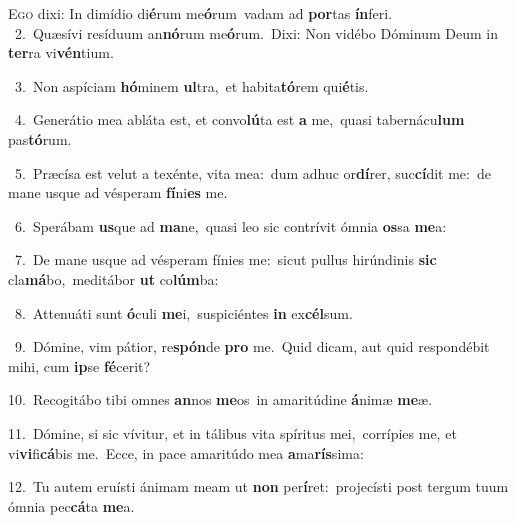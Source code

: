 \lettrine{\initial\textcolor{\initialcolor}{E}}{go} dixi: In dimídio di\-\textbf{é}\-rum me\-\textbf{ó}\-rum~\star vadam ad \textbf{por}\-tas \textbf{ín}\-feri.\\
{\numbfont\textcolor{\numbcolor}{~2.}}~Quæsívi resíduum an\-\textbf{nó}\-rum me\-\textbf{ó}\-rum.~\star Dixi: Non vidébo Dóminum Deum in \textbf{ter}\-ra vi\-\textbf{vén}\-tium.\par
{\numbfont\textcolor{\numbcolor}{~3.}}~Non aspíciam \textbf{hó}\-minem \textbf{ul}\-tra,~\star et habita\-\textbf{tó}\-rem qui\-\textbf{é}\-tis.\par
{\numbfont\textcolor{\numbcolor}{~4.}}~Generátio mea abláta est, et convo\-\textbf{lú}\-ta est \textbf{a} me,~\star quasi tabernácu\textbf{lum} pas\-\textbf{tó}\-rum.\par
{\numbfont\textcolor{\numbcolor}{~5.}}~Præcísa est velut a texénte, vita mea:~\dagger dum adhuc or\-\textbf{dí}\-rer, suc\-\textbf{cí}\-dit me:~\star de mane usque ad vésperam \textbf{fí}\-ni\textbf{es} me.\par
{\numbfont\textcolor{\numbcolor}{~6.}}~Sperábam \textbf{us}\-que ad \textbf{ma}\-ne,~\star quasi leo sic contrívit ómnia \textbf{os}\-sa \textbf{me}\-a:\par
{\numbfont\textcolor{\numbcolor}{~7.}}~De mane usque ad vésperam fínies me:~\dagger sicut pullus hirúndinis \textbf{sic} cla\-\textbf{má}\-bo,~\star meditábor \textbf{ut} co\-\textbf{lúm}\-ba:\par
{\numbfont\textcolor{\numbcolor}{~8.}}~Attenuáti sunt \textbf{ó}\-culi \textbf{me}\-i,~\star suspiciéntes \textbf{in} ex\-\textbf{cél}\-sum.\par
{\numbfont\textcolor{\numbcolor}{~9.}}~Dómine, vim pátior, re\-\textbf{spón}\-de \textbf{pro} me.~\star Quid dicam, aut quid respondébit mihi, cum \textbf{ip}\-se \textbf{fé}\-cerit?\par
{\numbfont\textcolor{\numbcolor}{10.}}~Recogitábo tibi omnes \textbf{an}\-nos \textbf{me}\-os~\star in amaritúdine \textbf{á}\-nimæ \textbf{me}\-æ.\par
{\numbfont\textcolor{\numbcolor}{11.}}~Dómine, si sic vívitur, et in tálibus vita spíritus mei,~\dagger corrípies me, et vi\-\textbf{vi}\-fi\-\textbf{cá}\-bis me.~\star Ecce, in pace amaritúdo mea \textbf{a}\-ma\-\textbf{rís}\-sima:\par
{\numbfont\textcolor{\numbcolor}{12.}}~Tu autem eruísti ánimam meam ut \textbf{non} per\-\textbf{í}\-ret:~\star projecísti post tergum tuum ómnia pec\-\textbf{cá}\-ta \textbf{me}\-a.\par
